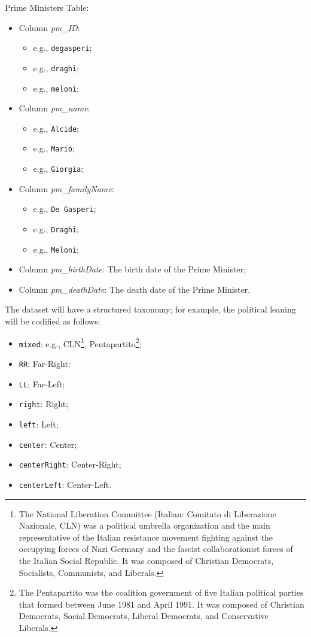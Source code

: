 Prime Ministers Table:
\begin{itemize}
    \item Column \textit{pm\_ID}:
    \begin{itemize}
        \item e.g., \texttt{degasperi};
        \item e.g., \texttt{draghi};
        \item e.g., \texttt{meloni};
    \end{itemize}
    \item Column \textit{pm\_name}:
    \begin{itemize}
        \item e.g., \texttt{Alcide};
        \item e.g., \texttt{Mario};
        \item e.g., \texttt{Giorgia};
    \end{itemize}
    \item Column \textit{pm\_familyName}:
    \begin{itemize}
        \item e.g., \texttt{De Gasperi};
        \item e.g., \texttt{Draghi};
        \item e.g., \texttt{Meloni};
    \end{itemize}
    \item Column \textit{pm\_birthDate}: The birth date of the Prime Minister;
    \item Column \textit{pm\_deathDate}: The death date of the Prime Minister.
\end{itemize}

The dataset will have a structured taxonomy; for example, the political leaning will be codified as follows: 
\begin{itemize}
    \item \texttt{mixed}: e.g., CLN\footnote{The National Liberation Committee (Italian: Comitato di Liberazione Nazionale, CLN) was a political umbrella organization and the main representative of the Italian resistance movement fighting against the occupying forces of Nazi Germany and the fascist collaborationist forces of the Italian Social Republic. It was composed of Christian Democrats, Socialists, Communists, and Liberals.}, Pentapartito\footnote{The Pentapartito was the coalition government of five Italian political parties that formed between June 1981 and April 1991. It was composed of Christian Democrats, Social Democrats, Liberal Democrats, and Conservative Liberals.};
    \item \texttt{RR}: Far-Right;
    \item \texttt{LL}: Far-Left;
    \item \texttt{right}: Right;
    \item \texttt{left}: Left;
    \item \texttt{center}: Center;
    \item \texttt{centerRight}: Center-Right;
    \item \texttt{centerLeft}: Center-Left.
\end{itemize}
